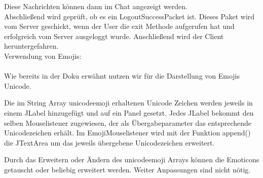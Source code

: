 \begin{itemize}
    Diese Nachrichten können dann im Chat angezeigt werden.\\
    
    Abschließend wird geprüft, ob es ein LogoutSuccessPacket ist. Dieses Paket wird vom Server geschickt, wenn der
    User die exit Methode aufgerufen hat und erfolgreich vom Server ausgeloggt wurde. Anschließend wird der Client
    heruntergefahren.\\
    
Verwendung von Emojis: \\\\
	Wie bereits in der Doku erwähnt nutzen wir für die Darstellung von Emojis Unicode.
	
	Die im String Array unicodeemoji erhaltenen Unicode Zeichen werden jeweils in einem JLabel hinzugefügt und auf ein Panel gesetzt. Jedes JLabel bekommt den selben Mouselistener zugewiesen, der als Übergabeparameter das entsprechende Unicodezeichen erhält. Im EmojiMouselistener wird mit der Funktion append() die JTextArea um das jeweils übergebene Unicodezeichen erweitert.
	
	Durch das Erweitern oder Ändern des unicodeemoji Arrays können die Emoticons getauscht oder beliebig erweitert werden. Weiter Anpassungen sind nicht nötig.
\end{itemize}



